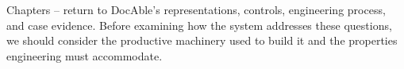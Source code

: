 

Chapters -- return to DocAble's representations, controls, engineering process, and case evidence. Before examining how the system addresses these questions, we should consider the productive machinery used to build it and the properties engineering must accommodate.
